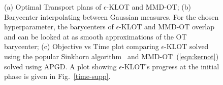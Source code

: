 \begin{figure}[t]
\begin{subfigure}{.3\textwidth}
    \caption{}
\end{subfigure}
\caption[Qualitative comparison of the OT plans and the corresponding barycenters of MMD-OT and related divergences with synthetic Gaussian distributions.]{(a) Optimal Transport plans of $\epsilon$-KLOT and MMD-OT; (b) Barycenter interpolating between Gaussian measures. For the chosen hyperparameter, the barycenters of $\epsilon$-KLOT and MMD-OT overlap and can be looked at as smooth approximations of the OT barycenter; (c) Objective vs Time plot comparing $\epsilon$-KLOT solved using the popular Sinkhorn algorithm~\citep{ChizatPSV18,pham20a}  and MMD-OT~(\ref{eqn:kernot}) solved using APGD. A plot showing $\epsilon$-KLOT's progress at the initial phase is given in Fig.~\ref{time-supp}. 
}\label{fig:planbarytime}
\end{figure}
